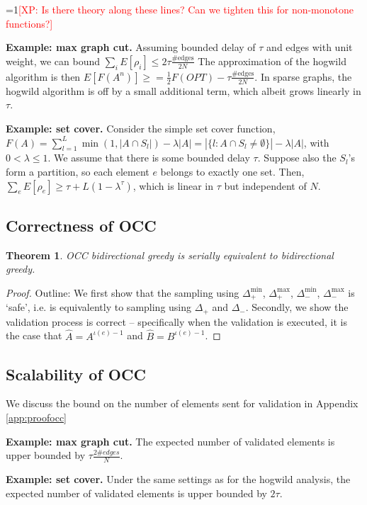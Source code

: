 \documentclass{article} %
\newtheorem{thm}{Theorem}[section]
\newcommand{\Comments}{1}
\newcommand{\note}[2]{\ifnum\Comments=1\textcolor{#1}{#2}\fi}
\newcommand{\xinghao}[1]{\note{red}{[XP: #1]}}
\begin{document}
\xinghao{Is there theory along these lines? Can we tighten this for non-monotone functions?}


\textbf{Example: max graph cut.}
Assuming bounded delay of $\tau$ and edges with unit weight, we can bound $\sum_i E[\rho_i] \leq 2\tau\frac{\text{\#edges}}{2N}$
The approximation of the hogwild algorithm is then $E[F(A^n)] \geq = \frac{1}{2} F(OPT) - \tau\frac{\#\text{edges}}{2N}$.
In sparse graphs, the hogwild algorithm is off by a small additional term, which albeit grows linearly in $\tau$.



\textbf{Example: set cover.}
Consider the simple set cover function,
$F(A) = \sum_{l=1}^L \min(1,|A\cap S_l|) - \lambda|A| = |\{l: A\cap S_l \neq\emptyset\}| - \lambda|A|$,
with $0 < \lambda \leq 1$.
We assume that there is some bounded delay $\tau$.
Suppose also the $S_l$'s form a partition, so each element $e$ belongs to exactly one set.
Then, $\sum_e E[\rho_e] \geq \tau + L(1-\lambda^\tau)$, which is linear in $\tau$ but independent of $N$.


\subsection{Correctness of OCC}
\begin{thm} OCC bidirectional greedy is serially equivalent to bidirectional greedy.
\end{thm}
\begin{proof}
Outline: We first show that the sampling using $\Delta_+^{\min}$, $\Delta_+^{\max}$, $\Delta_-^{\min}$, $\Delta_-^{\max}$ is `safe', i.e. is equivalently to sampling using $\Delta_+$ and $\Delta_-$.
Secondly, we show the validation process is correct -- specifically when the validation is executed, it is the case that $\hat{A} = A^{\iota(e)-1}$ and $\hat{B} = B^{\iota(e)-1}$.
\end{proof}



\subsection{Scalability of OCC}

We discuss the bound on the number of elements sent for validation in Appendix \ref{app:proofocc}

\textbf{Example: max graph cut.}
The expected number of validated elements is upper bounded by $\tau \frac{2\#edges}{N}$.

\textbf{Example: set cover.}
Under the same settings as for the hogwild analysis, the expected number of validated elements is upper bounded by $2\tau$.
\end{document}
